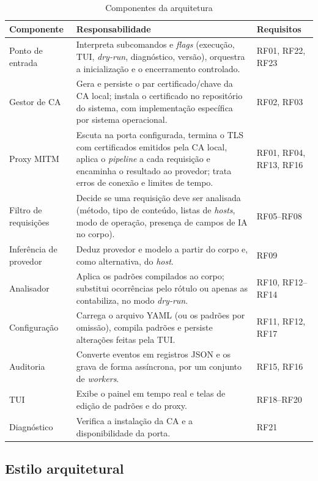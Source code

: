 \begin{table}[htb]
\centering
\caption{Componentes da arquitetura}\label{tab:componentes}
\small
\begin{tabular}{|p{3.0cm}|p{8.3cm}|p{2.6cm}|}
\hline
\textbf{Componente} & \textbf{Responsabilidade} & \textbf{Requisitos} \\ \hline
Ponto de entrada & Interpreta subcomandos e \textit{flags} (execução, TUI, \textit{dry-run}, diagnóstico, versão), orquestra a inicialização e o encerramento controlado. & RF01, RF22, RF23 \\ \hline
Gestor de CA & Gera e persiste o par certificado/chave da CA local; instala o certificado no repositório do sistema, com implementação específica por sistema operacional. & RF02, RF03 \\ \hline
Proxy MITM & Escuta na porta configurada, termina o TLS com certificados emitidos pela CA local, aplica o \textit{pipeline} a cada requisição e encaminha o resultado ao provedor; trata erros de conexão e limites de tempo. & RF01, RF04, RF13, RF16 \\ \hline
Filtro de requisições & Decide se uma requisição deve ser analisada (método, tipo de conteúdo, listas de \textit{hosts}, modo de operação, presença de campos de IA no corpo). & RF05--RF08 \\ \hline
Inferência de provedor & Deduz provedor e modelo a partir do corpo e, como alternativa, do \textit{host}. & RF09 \\ \hline
Analisador & Aplica os padrões compilados ao corpo; substitui ocorrências pelo rótulo ou apenas as contabiliza, no modo \textit{dry-run}. & RF10, RF12--RF14 \\ \hline
Configuração & Carrega o arquivo YAML (ou os padrões por omissão), compila padrões e persiste alterações feitas pela TUI. & RF11, RF12, RF17 \\ \hline
Auditoria & Converte eventos em registros JSON e os grava de forma assíncrona, por um conjunto de \textit{workers}. & RF15, RF16 \\ \hline
TUI & Exibe o painel em tempo real e telas de edição de padrões e do proxy. & RF18--RF20 \\ \hline
Diagnóstico & Verifica a instalação da CA e a disponibilidade da porta. & RF21 \\ \hline
\end{tabular}
\end{table}

\subsection{Estilo arquitetural}

